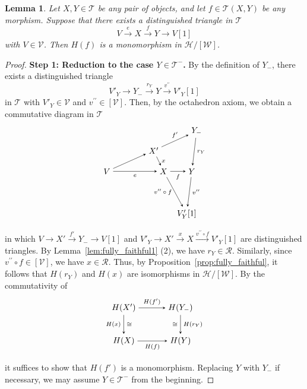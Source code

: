 \documentclass[a4paper,reqno,10pt]{amsart}
\newtheorem{lemma}[lemma]{Lemma}
\theoremstyle{definition}
\theoremstyle{definition}
\theoremstyle{definition}
\theoremstyle{definition}
\theoremstyle{plain}
\newcommand{\CH}{\mathcal{H}}
\newcommand{\CR}{\mathcal{R}}
\newcommand{\CT}{\mathcal{T}}
\newcommand{\CV}{\mathcal{V}}
\newcommand{\CW}{\mathcal{W}}
\begin{document}
\begin{lemma}\label{lem:H(f)_monom}
Let $X,Y\in\CT$ be any pair of objects, and let $f\in\CT(X,Y)$ be any morphism. Suppose that there exists a distinguished triangle in $\CT$
\[
V\xrightarrow{e}X\xrightarrow{f}Y\to V[1]
\]
with $V\in\CV$. Then $H(f)$ is a monomorphism in $\CH/[\CW]$.
\end{lemma}
\begin{proof}
\textbf{Step 1: Reduction to the case $Y\in\CT^-$.} By the definition of $Y_-$, there exists a distinguished triangle
\[
V'_Y\to Y_-\xrightarrow{r_Y}Y\xrightarrow{v^{\prime\prime}}V'_Y[1]
\]
in $\CT$ with $V'_Y\in\CV$ and $v^{\prime\prime}\in[\CV]$. Then, by the octahedron axiom, we obtain a commutative diagram in $\CT$
\[
\begin{tikzpicture}[>=stealth]
\node (1) at (-2.4,0) {$V$};
\node (2) at (-0.42,0.88) {$X'$};
\node (3) at (1.4,1.7) {$Y_-$};
\node (4) at (0,0) {$X$};
\node (5) at (1.2,0) {$Y$};
\node (6) at (0.98,-1.8) {$V'_Y[1]$};
\draw[->] (1) -- node[above, font=\scriptsize] {} (2);
\draw[->] (1) -- node[below,font=\scriptsize] {$e$} (4);
\draw[->] (2) -- node[above,font=\scriptsize] {$f'$} (3);
\draw[->] (2) -- node[right,font=\scriptsize] {$x$} (4);
\draw[->] (3) -- node[right,font=\scriptsize] {$r_Y$} (5);
\draw[->] (4) -- node[below,font=\scriptsize] {$f$} (5);
\draw[->] (4) -- node[left,font=\scriptsize] {$v^{\prime\prime}\circ f$} (6);
\draw[->] (5) -- node[right, font=\scriptsize] {$v^{\prime\prime}$} (6);
\end{tikzpicture}
\]
in which $V\to X'\xrightarrow{f'}Y_-\to V[1]$ and $V'_Y\to X'\xrightarrow{x}X\xrightarrow{v^{\prime\prime}\circ f}V'_Y[1]$ are distinguished triangles. By Lemma~\ref{lem:fully_faithful1} {\rm (2)}, we have $r_Y\in\CR$.
Similarly, since $v^{\prime\prime}\circ f\in[\CV]$, we have $x\in\CR$.
Thus, by Proposition~\ref{prop:fully_faithful}, it follows that $H(r_Y)$ and $H(x)$ are isomorphisms in $\CH/[\CW]$.
By the commutativity of 
\[
\begin{tikzpicture}[>=stealth]
\node (1) at (-1.2,0.7) {$H(X')$};
\node (2) at (1.2,0.7) {$H(Y_-)$};
\node (3) at (-1.2,-0.7) {$H(X)$};
\node (4) at (1.2,-0.7) {$H(Y)$};
\draw[->] (1) -- node[above,font=\scriptsize] {$H(f')$} (2);
\draw[->] (1) -- node[left,font=\scriptsize] {$H(x)$}
node[right,font=\scriptsize] {$\cong$}(3);
\draw[->] (2) -- node[left,font=\scriptsize] {$\cong$}
node[right,font=\scriptsize] {$H(r_Y)$}(4);
\draw[->] (3) -- node[below,font=\scriptsize] {$H(f)$} (4);
\end{tikzpicture}
\]
it suffices to show that $H(f')$ is a monomorphism. Replacing $Y$ with $Y_-$ if necessary, we may assume $Y\in\CT^-$ from the beginning.


\end{proof}
\end{document}
